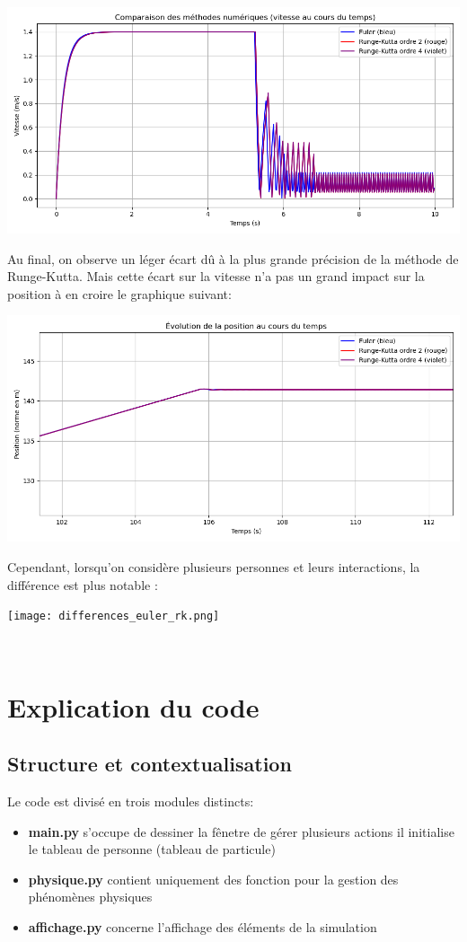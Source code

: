 \documentclass[a4paper,12pt]{article}
\begin{document}
\includegraphics[width=\textwidth]{runge.png}

Au final, on observe un léger écart dû à la plus grande précision de la méthode de Runge-Kutta. Mais cette écart sur la vitesse n'a pas un grand impact sur la position à en croire le graphique suivant:

\includegraphics[width=\textwidth]{runge_pos.png}

Cependant, lorsqu'on considère plusieurs personnes et leurs interactions, la différence est plus notable :

\texttt{[image: differences\_euler\_rk.png]}

\
\section{Explication du code}
\subsection{Structure et contextualisation}
\noindent Le code est divisé en trois modules distincts:
\begin{itemize}
	\item \textbf{main.py} s'occupe de dessiner la fênetre de gérer plusieurs actions il initialise le tableau de personne (tableau de particule)
	
	\item \textbf{physique.py} contient uniquement des fonction pour la gestion des phénomènes physiques

 	\item \textbf{affichage.py} concerne l'affichage des éléments de la simulation
\end{itemize}
\end{document}
